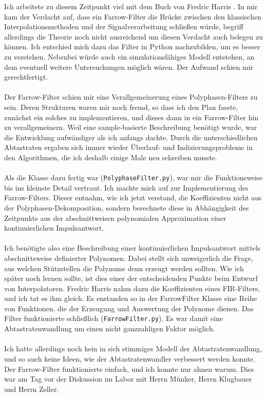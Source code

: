 \documentclass[11pt]{article}
\newcommand{\code}[1] {\texttt{#1}}
\begin{document}
Ich arbeitete zu diesem Zeitpunkt viel mit dem Buch von Fredric Harris \cite{Harris2004}. In mir kam der Verdacht auf, dass ein Farrow-Filter die Brücke zwischen den klassischen Interpolationsmethoden und der Signalverarbeitung schließen würde, begriff allerdings die Theorie noch nicht ausreichend um diesen Verdacht auch belegen zu können. Ich entschied mich dazu das Filter in Python nachzubilden, um es besser zu verstehen. Nebenbei würde auch ein simulationsfähiges Modell entstehen, an dem eventuell weitere Untersuchungen möglich wären. Der Aufwand schien mir gerechtfertigt.\\
\\
Der Farrow-Filter schien mir eine Verallgemeinerung eines Polyphasen-Filters zu sein. Deren Strukturen waren mir noch fremd, so dass ich den Plan fasste, zunächst ein solches zu implementieren, und dieses dann in ein Farrow-Filter hin zu verallgemeinern. Weil eine sample-basierte Beschreibung benötigt wurde, war die Entwicklung aufwändiger als ich anfangs dachte. Durch die unterschiedlichen Abtastraten ergaben sich immer wieder Überlauf- und Indizierungsprobleme in den Algorithmen, die ich deshalb einige Male neu schreiben musste. \\
\\
Als die Klasse dazu fertig war (\code{PolyphaseFilter.py}), war mir die Funktionsweise bis ins kleinste Detail vertraut. Ich machte mich auf zur Implementierung des Farrow-Filters. Dieser entnahm, wie ich jetzt verstand, die Koeffizienten nicht aus der Polyphasen-Dekomposition, sondern berechnete diese in Abhängigkeit des Zeitpunkts aus der abschnittweisen polynomialen Approximation einer kontinuierlichen Impulsantwort.\\
\\
Ich benötigte also eine Beschreibung einer kontinuierlichen Impulsantwort mittels abschnittsweise definierter Polynomen. Dabei stellt sich unweigerlich die Frage, aus welchen Stützstellen die Polynome denn erzeugt werden sollten. Wie ich später noch lernen sollte, ist dies einer der entscheidenden Punkte beim Entwurf von Interpolatoren. Fredric Harris nahm dazu die Koeffizienten eines FIR-Filters, und ich tat es ihm gleich. Es enstanden so in der FarrowFilter Klasse eine Reihe von Funktionen, die der Erzeugung und Auswertung der Polynome dienen. Das Filter funktionierte schließlich (\code{FarrowFilter.py}). Es war damit eine Abtastratenwandlung um einen nicht ganzzahligen Faktor möglich. \\
\\
Ich hatte allerdings noch kein in sich stimmiges Modell der Abtastratenwandlung, und so auch keine Ideen, wie der Abtastratenwandler verbessert werden konnte. Der Farrow-Filter funktionierte einfach, und ich konnte nur ahnen warum. Dies war am Tag vor der Diskussion im Labor mit Herrn Münker, Herrn Klugbauer und Herrn Zeller.\\
\\
\end{document}
